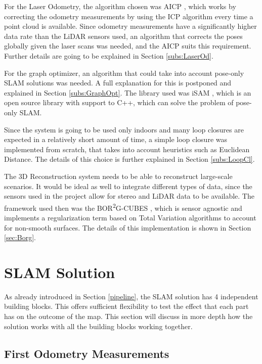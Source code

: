 \documentclass[12pt]{article}
\begin{document}
For the Laser Odometry, the algorithm chosen was AICP \cite{7989547}, which works by correcting the odometry measurements by using the ICP algorithm every time a point cloud is available. Since odometry measurements have a significantly higher data rate than the LiDAR sensors used, an algorithm that corrects the poses globally given the laser scans was needed, and the AICP suits this requirement. Further details are going to be explained in Section \ref{subs:LaserOd}.
	
For the graph optimizer, an algorithm that could take into account pose-only SLAM solutions was needed. A full explanation for this is postponed and explained in Section \ref{subs:GraphOpt}. The library used was iSAM \cite{Kaess08tro}, which is an open source library with support to C++, which can solve the problem of pose-only SLAM.
	
Since the system is going to be used only indoors and many loop closures are expected in a relatively short amount of time, a simple loop closure was implemented from scratch, that takes into account heuristics such as Euclidean Distance. The details of this choice is further explained in Section \ref{subs:LoopCl}.
	
The 3D Reconstruction system needs to be able to reconstruct large-scale scenarios. It would be ideal as well to integrate different types of data, since the sensors used in the project allow for stereo and LiDAR data to be available. The framework used then was the BOR\textsuperscript{2}G-CUBES \cite{TannerFSR2015}\cite{TannerArXiv2016}, which is sensor agnostic and implements a regularization term based on Total Variation algorithms to account for non-smooth surfaces. The details of this implementation is shown in Section \ref{sec:Borg}.
		
	\newpage
	\section{SLAM Solution}

As already introduced in Section \ref{pipeline}, the SLAM solution has 4 independent building blocks. This offers sufficient flexibility to test the effect that each part has on the outcome of the map. This section will discuss in more depth how the solution works with all the building blocks working together. 
	 
	\subsection{First Odometry Measurements}
\end{document}
